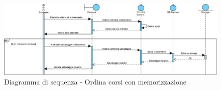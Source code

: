 \begin{figure}
	\centering
	\includegraphics[width=6.5in]{imgs/gruppo1/sequence_diagrams/SD4_ordina_corsi_con_memorizzazione.pdf}
	\caption{Diagramma di sequenza - Ordina corsi con memorizzazione}
	\label{diag:ordinaCorsiConMemSD}
\end{figure}

\clearpage
